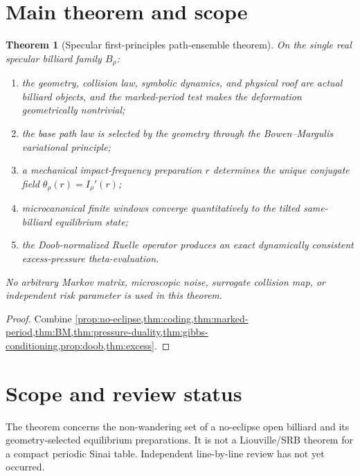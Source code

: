 \documentclass[11pt,reqno]{amsart}
\newtheorem{theorem}{Theorem}[section]
\theoremstyle{definition}
\theoremstyle{remark}
\begin{document}
\section{Main theorem and scope}\label{sec:main}
\begin{theorem}[Specular first-principles path-ensemble theorem]\label{thm:main}
On the single real specular billiard family $B_\rho$:
\begin{enumerate}[label=(\roman*)]
\item the geometry, collision law, symbolic dynamics, and physical roof are
actual billiard objects, and the marked-period test makes the deformation
geometrically nontrivial;
\item the base path law is selected by the geometry through the
Bowen--Margulis variational principle;
\item a mechanical impact-frequency preparation $r$ determines the unique
conjugate field $\theta_\rho(r)=I_\rho'(r)$;
\item microcanonical finite windows converge quantitatively to the tilted
same-billiard equilibrium state;
\item the Doob-normalized Ruelle operator produces an exact dynamically
consistent excess-pressure theta-evaluation.
\end{enumerate}
No arbitrary Markov matrix, microscopic noise, surrogate collision map, or
independent risk parameter is used in this theorem.
\end{theorem}
\begin{proof}
Combine \cref{prop:no-eclipse,thm:coding,thm:marked-period,thm:BM,thm:pressure-duality,thm:gibbs-conditioning,prop:doob,thm:excess}.
\end{proof}

\section*{Scope and review status}
The theorem concerns the non-wandering set of a no-eclipse open billiard and
its geometry-selected equilibrium preparations.  It is not a Liouville/SRB
theorem for a compact periodic Sinai table.  Independent line-by-line review
has not yet occurred.

\nocite{*}


\end{document}
